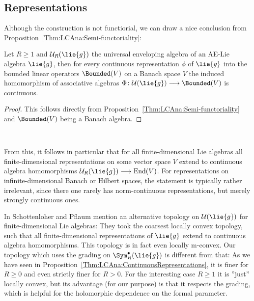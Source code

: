 \subsection{Representations}

Although the construction is not functiorial, we can draw a nice conclusion 
from Proposition~\ref{Thm:LCAna:Semi-functoriality}:
\begin{proposition}
    \label{Prop:LCAna:ContinuousRepresentations}%
    Let $R \geq 1$ and $\mathcal{U}_R(\lie{g})$ the universal
    enveloping algebra of an AE-Lie algebra $\lie{g}$, then for every
    continuous representation $\phi$ of $\lie{g}$ into the bounded
    linear operators $\Bounded(V)$ on a Banach space $V$ the induced
    homomorphism of associative algebras $\Phi \colon
    \mathcal{U}(\lie{g}) \longrightarrow \Bounded(V)$ is continuous.
\end{proposition}
\begin{proof}
    This follows directly from
    Proposition~\ref{Thm:LCAna:Semi-functoriality} and $\Bounded(V)$
    being a Banach algebra.
\end{proof}
\begin{remark}
    \label{Rem:LCAnaBCHConvergence}
    ~
    \begin{remarklist}
    \item \label{item:FiniteDimRepsContinuous} From this, it follows
        in particular that for all finite-dimensional Lie algebras all
        finite-dimensional representations on some vector space $V$
        extend to continuous algebra homomorphisms
        $\mathcal{U}_R(\lie{g}) \longrightarrow
        \operatorname{End}(V)$. For representations on
        infinite-dimensional Banach or Hilbert spaces, the statement
        is typically rather irrelevant, since there one rarely has
        norm-continuous representations, but merely strongly
        continuous ones.
    \item In \cite{pflaum.schottenloher:1998a} Schottenloher and
        Pflaum mention an alternative topology on
        $\mathcal{U}(\lie{g})$ for finite-dimensional Lie algebras:
        They took the coarsest locally convex topology, such that all
        finite-dimensional representations of $\lie{g}$ extend to
        continuous algebra homomorphisms. This topology is in fact
        even locally m-convex. Our topology which uses the grading on
        $\Sym_R^{\bullet}(\lie{g})$ is different from that: As we have
        seen in Proposition~\ref{Thm:LCAna:ContinuousRepresentations},
        it is finer for $R \geq 0$ and even strictly finer for $R >
        0$. For the interesting case $R \geq 1$ it is ''just'' locally
        convex, but its advantage (for our purpose) is that it
        respects the grading, which is helpful for the holomorphic
        dependence on the formal parameter. 
    \end{remarklist}
\end{remark}
